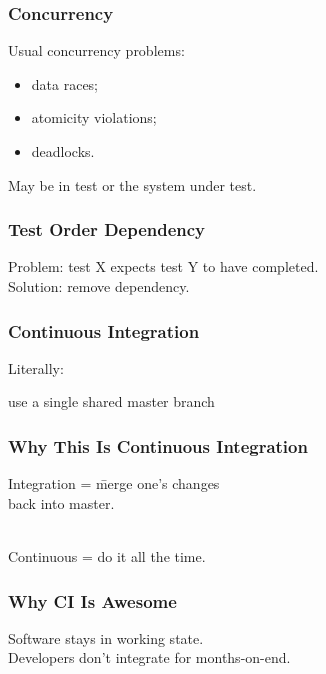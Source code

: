 \documentclass{beamer}
\newenvironment{changemargin}[1]{%
  \begin{list}{}{%
    \setlength{\topsep}{0pt}%
    \setlength{\leftmargin}{#1}%
    \setlength{\rightmargin}{1em}
    \setlength{\listparindent}{\parindent}%
    \setlength{\itemindent}{\parindent}%
    \setlength{\parsep}{\parskip}%
  }%
  \item[]}{\end{list}}
\begin{document}
\begin{frame}
  \frametitle{Concurrency}
  \Large
  \begin{changemargin}{1cm}
    Usual concurrency problems:
    \begin{itemize}
    \item data races;
    \item atomicity violations;
    \item deadlocks.
    \end{itemize}
    May be in test or the system under test.
  \end{changemargin}
\end{frame}

\begin{frame}
  \frametitle{Test Order Dependency}
  \Large
  \begin{changemargin}{1cm}
    Problem: test X expects test Y to have completed.\\
    Solution: remove dependency.
  \end{changemargin}
\end{frame}

\begin{frame}
  \frametitle{Continuous Integration}

  \Large
  \begin{changemargin}{2cm}
    Literally:
  \end{changemargin}
    \begin{center}
      use a single shared master branch
    \end{center}
\end{frame}

\begin{frame}
  \frametitle{Why This Is Continuous Integration}

  \Large
  \begin{changemargin}{2cm}
    \begin{tabbing}
    Integration = \= merge one's changes \\
    \> back into master.
    \end{tabbing}
    ~\\
    Continuous = do it all the time.
  \end{changemargin}
\end{frame}

\begin{frame}
  \frametitle{Why CI Is Awesome}

  \Large
  \begin{changemargin}{1cm}
    Software stays in working state.\\[1em]
    Developers don't integrate for months-on-end.
  \end{changemargin}
\end{frame}
\end{document}
